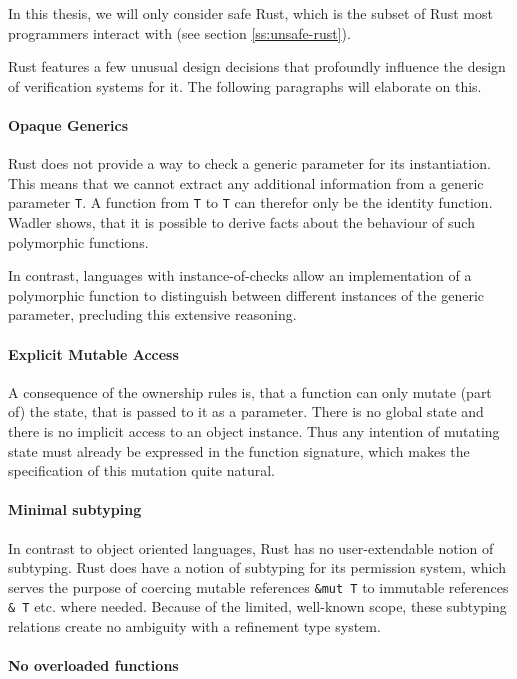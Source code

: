 \documentclass{book}
\newcommand{\code}[1]{\texttt{#1}}
\theoremstyle{definition}
\begin{document}
In this thesis, we will only consider safe Rust, which is the subset of Rust most programmers interact with (see section \ref{ss:unsafe-rust}).

Rust features a few unusual design decisions that profoundly influence the design of verification systems for it. The following paragraphs will elaborate on this.


\paragraph*{Opaque Generics} Rust does not provide a way to check a generic parameter for its instantiation. This means that we cannot extract any additional information from a generic parameter \code{T}. A function from \code{T} to \code{T} can therefor only be the identity function.
Wadler \cite{wadler_theorems_1989} shows, that it is possible to derive facts about the behaviour of such polymorphic functions.

In contrast, languages with instance-of-checks allow an implementation of a polymorphic function to distinguish between different instances of the generic parameter, precluding this extensive reasoning.

\paragraph*{Explicit Mutable Access} A consequence of the ownership rules is, that a function can only mutate (part of) the state, that is passed to it as a parameter. There is no global state and there is no implicit access to an object instance. Thus any intention of mutating state must already be expressed in the function signature, which makes the specification of this mutation quite natural.

\paragraph*{Minimal subtyping} In contrast to object oriented languages, Rust has no user-extendable notion of subtyping. 
Rust does have a notion of subtyping for its permission system, which serves the purpose of coercing mutable references \code{\&mut T} to immutable references \code{\& T} etc. where needed. Because of the limited, well-known scope, these subtyping relations create no ambiguity with a refinement type system.

\paragraph*{No overloaded functions}
\end{document}
